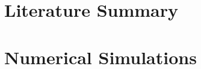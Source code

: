 \documentclass[
  oneside,
  11pt, a4paper,
  footinclude=true,
  headinclude=true,
  cleardoublepage=empty
]{scrbook}
\def\SubfileBibliography{\setlength{\bibsep}{0pt}}
\begin{document}
\def\SubfileBibliography{}


\frontmatter
%




% 


\mainmatter
\part{Literature Summary}





\part{Numerical Simulations}










\clearpage
{}

\setlength{\bibsep}{0pt}  %

\end{document}
